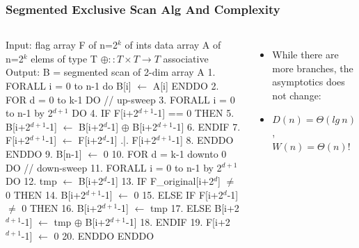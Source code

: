 \documentclass{beamer}
\renewcommand{\emph}[1]{\textcolor{structure}{#1}}
\newcommand{\emp}[1]{\textcolor{DikuRed}{ #1}}
\newcommand{\mymath}[1]{$ #1 $}
\newcommand{\myindu}[1]{^{#1}}
\begin{document}
\begin{frame}[fragile,t]
  \frametitle{Segmented Exclusive Scan Alg And Complexity}
\vspace{-2ex}
\begin{columns}
\begin{colorcode}[fontsize=\scriptsize]
Input:  flag array F of n=2\mymath{\myindu{k}} of ints
        data array A of n=2\mymath{\myindu{k}} elems of type T
        \mymath{\oplus::T\times T\rightarrow T} associative
Output: B = segmented scan of 2-dim array A
1.  \emph{FORALL i = 0 to n-1 do} B[i] \mymath{\leftarrow} A[i] \emph{ENDDO}
2.  \emp{FOR d = 0 to k-1 DO} \emph{// up-sweep}
3.    \emph{FORALL i = 0 to n-1 by 2\mymath{\myindu{d+1}} DO} 
4.      IF F[i+2\mymath{\myindu{d+1}}-1] == 0 THEN 
5.          B[i+2\mymath{\myindu{d+1}}-1] \mymath{\leftarrow} B[i+2\mymath{\myindu{d}}-1] \mymath{\oplus} B[i+2\mymath{\myindu{d+1}}-1]
6.      ENDIF
7.      F[i+2\mymath{\myindu{d+1}}-1] \mymath{\leftarrow} F[i+2\mymath{\myindu{d}}-1] .|. F[i+2\mymath{\myindu{d+1}}-1]
8.  \emp{ENDDO} \emph{ENDDO}
9.  B[n-1] \mymath{\leftarrow} 0
10. \emp{FOR d = k-1 downto 0 DO} \emph{// down-sweep}
11.   \emph{FORALL i = 0 to n-1 by 2\mymath{\myindu{d+1}} DO} 
12.     tmp \mymath{\leftarrow} B[i+2\mymath{\myindu{d}}-1]
13.     IF \alert{F\_original}[i+2\mymath{\myindu{d}}] \mymath{\neq} 0 THEN
14.          B[i+2\mymath{\myindu{d+1}}-1] \mymath{\leftarrow} 0
15.     ELSE IF F[i+2\mymath{\myindu{d}}-1] \mymath{\neq} 0 THEN
16.          B[i+2\mymath{\myindu{d+1}}-1] \mymath{\leftarrow} tmp
17.     ELSE B[i+2\mymath{\myindu{d+1}}-1] \mymath{\leftarrow} tmp \mymath{\oplus} B[i+2\mymath{\myindu{d+1}}-1]
18.     ENDIF
19.     F[i+2\mymath{\myindu{d+1}}-1] \mymath{\leftarrow} 0
20. \emp{ENDDO} \emph{ENDDO}
\end{colorcode}
\begin{itemize} 
    \item While there are more branches, the asymptotics 
            does not change:
    \item \emph{$D(n) = \Theta(lg \ n)$},\\\emp{$W(n) = \Theta(n)$!}
\end{itemize}
\end{columns}

%


\end{frame}
\end{document}
